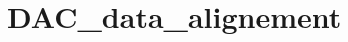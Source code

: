 \hypertarget{group___d_a_c__data__alignement}{\section{D\-A\-C\-\_\-data\-\_\-alignement}
\label{group___d_a_c__data__alignement}
}
